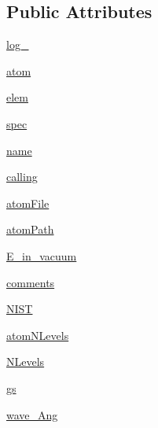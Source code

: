 \subsection*{Public Attributes}
\begin{DoxyCompactItemize}
\item 
\hyperlink{classpyneb_1_1core_1_1pynebcore_1_1___atom_data_ascii_aaddba4bcc59a7a5e69c08b2545939737}{log\+\_\+}
\item 
\hyperlink{classpyneb_1_1core_1_1pynebcore_1_1___atom_data_ascii_a5c98b93fd3ae381abca175c8baee6c0e}{atom}
\item 
\hyperlink{classpyneb_1_1core_1_1pynebcore_1_1___atom_data_ascii_a330140eda27048983020488e50c5858a}{elem}
\item 
\hyperlink{classpyneb_1_1core_1_1pynebcore_1_1___atom_data_ascii_a6a8de35e7e1695c3dd670b46c776f45e}{spec}
\item 
\hyperlink{classpyneb_1_1core_1_1pynebcore_1_1___atom_data_ascii_ab03fcf558862acb02a57ccd5accf155d}{name}
\item 
\hyperlink{classpyneb_1_1core_1_1pynebcore_1_1___atom_data_ascii_af5c364ae799620ff1af6870cf78ae19b}{calling}
\item 
\hyperlink{classpyneb_1_1core_1_1pynebcore_1_1___atom_data_ascii_a1163ceae1cb5263c39055a9c02f5c051}{atom\+File}
\item 
\hyperlink{classpyneb_1_1core_1_1pynebcore_1_1___atom_data_ascii_ae16a1eb022aac82bfee45f425a21ed90}{atom\+Path}
\item 
\hyperlink{classpyneb_1_1core_1_1pynebcore_1_1___atom_data_ascii_a468f4b6f8f580799b9d4a2a81e79941a}{E\+\_\+in\+\_\+vacuum}
\item 
\hyperlink{classpyneb_1_1core_1_1pynebcore_1_1___atom_data_ascii_a935b1baf76c6450653d1ebb673bc8f08}{comments}
\item 
\hyperlink{classpyneb_1_1core_1_1pynebcore_1_1___atom_data_ascii_a95b245a32e3666f6313e40a6ea8e627c}{N\+I\+S\+T}
\item 
\hyperlink{classpyneb_1_1core_1_1pynebcore_1_1___atom_data_ascii_a58e3b3de028fdda9d52cade8e378fe2d}{atom\+N\+Levels}
\item 
\hyperlink{classpyneb_1_1core_1_1pynebcore_1_1___atom_data_ascii_a1203cca412f63428b8ff106d608b8d83}{N\+Levels}
\item 
\hyperlink{classpyneb_1_1core_1_1pynebcore_1_1___atom_data_ascii_aed6d711337dfb385d65306e7f3c4d06d}{gs}
\item 
\hyperlink{classpyneb_1_1core_1_1pynebcore_1_1___atom_data_ascii_a1366f737e51b5a0f3706b68b0d06bfe5}{wave\+\_\+\+Ang}
\end{DoxyCompactItemize}
